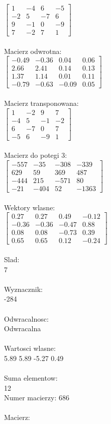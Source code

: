 \documentclass[a4paper,12pt]{article}
\begin{document}
$\begin{bmatrix} 1&-4&6&-5\\-2&5&-7&6\\9&-1&0&-9\\7&-2&7&1 \end{bmatrix}$
\\
\\
Macierz odwrotna:\\

$\begin{bmatrix} -0.49&-0.36&0.04&0.06\\2.66&2.41&0.14&0.13\\1.37&1.14&0.01&0.11\\-0.79&-0.63&-0.09&0.05 \end{bmatrix}$
\\
\\
Macierz transponowana:\\

$\begin{bmatrix} 1&-2&9&7\\-4&5&-1&-2\\6&-7&0&7\\-5&6&-9&1 \end{bmatrix}$
\\
\\
Macierz do potegi 3:\\

$\begin{bmatrix} -557&-35&-308&-339\\629&59&369&487\\-444&215&-571&80\\-21&-404&52&-1363 \end{bmatrix}$
\\
\\
Wektory wlasne:\\

$\begin{bmatrix} 0.27&0.27&0.49&-0.12\\-0.36&-0.36&-0.47&0.88\\0.08&0.08&-0.73&0.39\\0.65&0.65&0.12&-0.24 \end{bmatrix}$
\\
\\
Slad:\\
7
\\
\\
Wyznacznik:\\
-284
\\
\\
Odwracalnosc:\\
Odwracalna
\\
\\
Wartosci wlasne:\\
5.89 5.89 -5.27 0.49
\\
\\
Suma elementow:\\
12
\\
\newpage
Numer macierzy:
686
\\
\\
Macierz:\\
\end{document}
